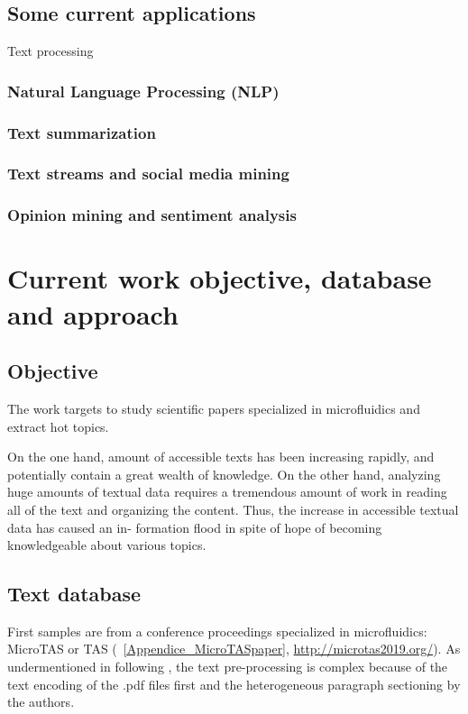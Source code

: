 \subsection{Some current applications}
Text processing 
\subsubsection{Natural Language Processing (NLP)}
\subsubsection{Text summarization}
\subsubsection{Text streams and social media mining}
\subsubsection{Opinion mining and sentiment analysis}

\section{Current work objective, database and approach}

\subsection{Objective}
The work targets to study scientific papers specialized in microfluidics and extract hot topics. 

On the one hand, amount of accessible texts has been increasing rapidly, and potentially contain a great wealth of knowledge.
On the other hand, analyzing huge amounts of textual data requires a tremendous amount of work in reading all of the text and organizing the content. Thus, the increase in accessible textual data has caused an in- formation flood in spite of hope of becoming knowledgeable about various topics.



\subsection{Text database}
First samples are from a conference proceedings specialized in microfluidics: MicroTAS or \textmu TAS (\appendice~\ref{Appendice_MicroTASpaper}, \url{http://microtas2019.org/}).
As undermentioned in following \chap, the text pre-processing is complex because of the text encoding of the .pdf files first and the heterogeneous paragraph sectioning by the authors. 

